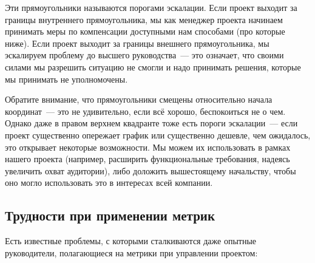\documentclass{../../text-style}
\begin{document}
Эти прямоугольники называются порогами эскалации. Если проект выходит за границы внутреннего прямоугольника, мы как менеджер проекта начинаем принимать меры по компенсации доступными нам способами (про которые ниже). Если проект выходит за границы внешнего прямоугольника, мы эскалируем проблему до высшего руководства~--- это означает, что своими силами мы разрешить ситуацию не смогли и надо принимать решения, которые мы принимать не уполномочены.

Обратите внимание, что прямоугольники смещены относительно начала координат~--- это не удивительно, если всё хорошо, беспокоиться не о чем. Однако даже в правом верхнем квадранте тоже есть пороги эскалации~--- если проект существенно опережает график или существенно дешевле, чем ожидалось, это открывает некоторые возможности. Мы можем их использовать в рамках нашего проекта (например, расширить функциональные требования, надеясь увеличить охват аудитории), либо доложить вышестоящему начальству, чтобы оно могло использовать это в интересах всей компании.

\subsection{Трудности при применении метрик}

Есть известные проблемы, с которыми сталкиваются даже опытные руководители, полагающиеся на метрики при управлении проектом:
\end{document}
